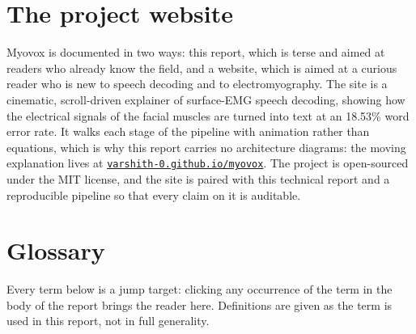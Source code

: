 \documentclass{article}
\begin{document}
\section{The project website}

Myovox is documented in two ways: this report, which is terse and aimed at readers who already know
the field, and a website, which is aimed at a curious reader who is new to speech decoding and to
electromyography. The site is a cinematic, scroll-driven explainer of surface-EMG speech decoding,
showing how the electrical signals of the facial muscles are turned into text at an 18.53\% word error
rate. It walks each stage of the pipeline with animation rather than equations, which is why this
report carries no architecture diagrams: the moving explanation lives at
\href{https://varshith-0.github.io/myovox/}{\texttt{varshith-0.github.io/myovox}}. The project is
open-sourced under the MIT license, and the site is paired with this technical report and a
reproducible pipeline so that every claim on it is auditable.

\section{Glossary}
\label{sec:glossary}

Every term below is a jump target: clicking any occurrence of the term in the body of the report
brings the reader here. Definitions are given as the term is used in this report, not in full
generality.
\end{document}
